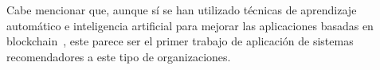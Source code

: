 Cabe mencionar que, aunque sí se han utilizado técnicas de aprendizaje automático e inteligencia artificial para mejorar las aplicaciones basadas en blockchain~\cite{ressi_ai-enhanced_2024}, este parece ser el primer trabajo de aplicación de sistemas recomendadores a este tipo de organizaciones.



